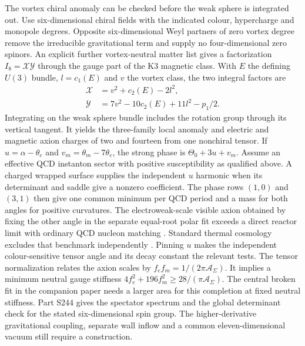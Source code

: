 \documentclass[aps,prd,reprint,onecolumn,nofootinbib,amsmath,amssymb]{revtex4-2}
\begin{document}
The vortex chiral anomaly can be checked before the weak sphere is integrated out. Use six-dimensional chiral fields with the indicated colour, hypercharge and monopole degrees. Opposite six-dimensional Weyl partners of zero vortex degree remove the irreducible gravitational term and supply no four-dimensional zero spinors. An explicit further vortex-neutral matter list gives a factorization $I_8=\mathcal X\mathcal Y$ through the gauge part of the K3 magnetic class. With $E$ the defining $U(3)$ bundle, $l=c_1(E)$ and $v$ the vortex class, the two integral factors are
\begin{equation}
 \begin{split}
 \mathcal X&=v^2+c_2(E)-2l^2,\\
 \mathcal Y&=7v^2-10c_2(E)+11l^2-p_1/2 .
 \end{split}
\end{equation}
Integrating on the weak sphere bundle includes the rotation group through its vertical tangent. It yields the three-family local anomaly and electric and magnetic axion charges of two and fourteen from one nonchiral tensor. If $u=\alpha-\theta_e$ and $v_m=\theta_m-7\theta_e$, the strong phase is $\Theta_0+3u+v_m$. Assume an effective QCD instanton sector with positive susceptibility as qualified above. A charged wrapped surface supplies the independent $u$ harmonic when its determinant and saddle give a nonzero coefficient. The phase rows $(1,0)$ and $(3,1)$ then give one common minimum per QCD period and a mass for both angles for positive curvatures. The electroweak-scale visible axion obtained by fixing the other angle in the separate equal-root polar fit exceeds a direct reactor limit with ordinary QCD nucleon matching \cite{TEXONO2007Axions,Grilli2016Axion}. Standard thermal cosmology excludes that benchmark independently \cite{Cadamuro2011Axion}. Pinning $u$ makes the independent colour-sensitive tensor angle and its decay constant the relevant tests. The tensor normalization relates the axion scales by $f_e f_m=1/(2\pi\mathcal A_\Sigma)$. It implies a minimum neutral gauge stiffness $4f_e^2+196f_m^2\geq28/(\pi\mathcal A_\Sigma)$. The central broken fit in the companion paper needs a larger area for this completion at fixed neutral stiffness. Part S244 gives the spectator spectrum and the global determinant check for the stated six-dimensional spin group. The higher-derivative gravitational coupling, separate wall inflow and a common eleven-dimensional vacuum still require a construction.
\end{document}
